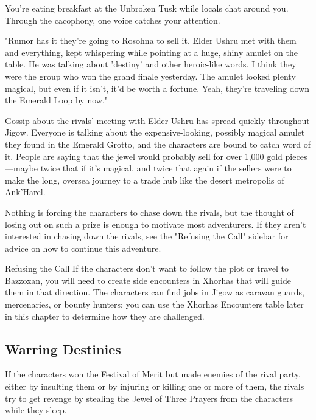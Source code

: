 \documentclass[10pt,a4paper,twoside,twocolumn,openany,nodeprecatedcode]{dndbook}
\begin{document}
\begin{DndReadAloud}{}
You're eating breakfast at the Unbroken Tusk while locals chat around you. Through the cacophony, one voice catches your attention.

"Rumor has it they're going to Rosohna to sell it. Elder Ushru met with them and everything, kept whispering while pointing at a huge, shiny amulet on the table. He was talking about 'destiny' and other heroic-like words. I think they were the group who won the grand finale yesterday. The amulet looked plenty magical, but even if it isn't, it'd be worth a fortune. Yeah, they're traveling down the Emerald Loop by now."

\end{DndReadAloud}

Gossip about the rivals' meeting with Elder Ushru has spread quickly throughout Jigow. Everyone is talking about the expensive-looking, possibly magical amulet they found in the Emerald Grotto, and the characters are bound to catch word of it. People are saying that the jewel would probably sell for over 1,000 gold pieces—maybe twice that if it's magical, and twice that again if the sellers were to make the long, oversea journey to a trade hub like the desert metropolis of Ank'Harel.

Nothing is forcing the characters to chase down the rivals, but the thought of losing out on such a prize is enough to motivate most adventurers. If they aren't interested in chasing down the rivals, see the "Refusing the Call" sidebar for advice on how to continue this adventure.

\begin{DndSidebar}[float=!b]{Refusing the Call}
If the characters don't want to follow the plot or travel to Bazzoxan, you will need to create side encounters in Xhorhas that will guide them in that direction. The characters can find jobs in Jigow as caravan guards, mercenaries, or bounty hunters; you can use the Xhorhas Encounters table later in this chapter to determine how they are challenged.



\end{DndSidebar}

\subsection{Warring Destinies}
If the characters won the Festival of Merit but made enemies of the rival party, either by insulting them or by injuring or killing one or more of them, the rivals try to get revenge by stealing the Jewel of Three Prayers from the characters while they sleep.
\end{document}
